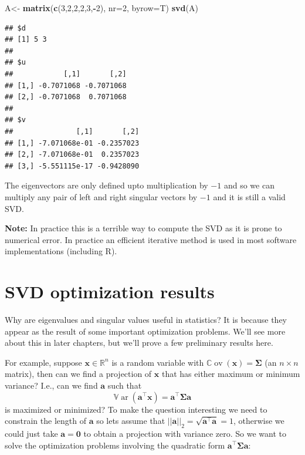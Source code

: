 \documentclass[]{book}
\newenvironment{Shaded}{\begin{snugshade}}{\end{snugshade}}
\newcommand{\DataTypeTok}[1]{\textcolor[rgb]{0.13,0.29,0.53}{#1}}
\newcommand{\DecValTok}[1]{\textcolor[rgb]{0.00,0.00,0.81}{#1}}
\newcommand{\KeywordTok}[1]{\textcolor[rgb]{0.13,0.29,0.53}{\textbf{#1}}}
\newcommand{\NormalTok}[1]{#1}
\newcommand{\OperatorTok}[1]{\textcolor[rgb]{0.81,0.36,0.00}{\textbf{#1}}}
\newcommand{\StringTok}[1]{\textcolor[rgb]{0.31,0.60,0.02}{#1}}
\theoremstyle{definition}
\theoremstyle{definition}
\theoremstyle{definition}
\theoremstyle{remark}
\begin{document}
\begin{Shaded}
\begin{Highlighting}[]
\NormalTok{A<-}\StringTok{ }\KeywordTok{matrix}\NormalTok{(}\KeywordTok{c}\NormalTok{(}\DecValTok{3}\NormalTok{,}\DecValTok{2}\NormalTok{,}\DecValTok{2}\NormalTok{,}\DecValTok{2}\NormalTok{,}\DecValTok{3}\NormalTok{,}\OperatorTok{-}\DecValTok{2}\NormalTok{), }\DataTypeTok{nr=}\DecValTok{2}\NormalTok{, }\DataTypeTok{byrow=}\NormalTok{T)}
\KeywordTok{svd}\NormalTok{(A)}
\end{Highlighting}
\end{Shaded}

\begin{verbatim}
## $d
## [1] 5 3
## 
## $u
##            [,1]       [,2]
## [1,] -0.7071068 -0.7071068
## [2,] -0.7071068  0.7071068
## 
## $v
##               [,1]       [,2]
## [1,] -7.071068e-01 -0.2357023
## [2,] -7.071068e-01  0.2357023
## [3,] -5.551115e-17 -0.9428090
\end{verbatim}

The eigenvectors are only defined upto multiplication by \(-1\) and so we can multiply any pair of left and right singular vectors by \(-1\) and it is still a valid SVD.

\textbf{Note:} In practice this is a terrible way to compute the SVD as it is prone to numerical error. In practice an efficient iterative method is used in most software implementations (including R).

\hypertarget{svdopt}{%
\section{SVD optimization results}\label{svdopt}}

Why are eigenvalues and singular values useful in statistics? It is because they appear as the result of some important optimization problems. We'll see more about this in later chapters, but we'll prove a few preliminary results here.

For example, suppose \(\boldsymbol x\in\mathbb{R}^n\) is a random variable with \({\mathbb{C}\operatorname{ov}}(\boldsymbol x)=\boldsymbol \Sigma\) (an \(n \times n\) matrix), then can we find a projection of \(\boldsymbol x\) that has either maximum or minimum variance? I.e., can we find \(\boldsymbol a\) such that \[{\mathbb{V}\operatorname{ar}}(\boldsymbol a^\top\boldsymbol x)=\boldsymbol a^\top \boldsymbol \Sigma\boldsymbol a\] is maximized or minimized?
To make the question interesting we need to constrain the length of \(\boldsymbol a\) so lets assume that \(||\boldsymbol a||_2 = \sqrt{\boldsymbol a^\top \boldsymbol a}=1\), otherwise we could just take \(\boldsymbol a=\boldsymbol 0\) to obtain a projection with variance zero. So we want to solve the optimization problems involving the quadratic form \(\boldsymbol a^\top \boldsymbol \Sigma\boldsymbol a\):
\end{document}
